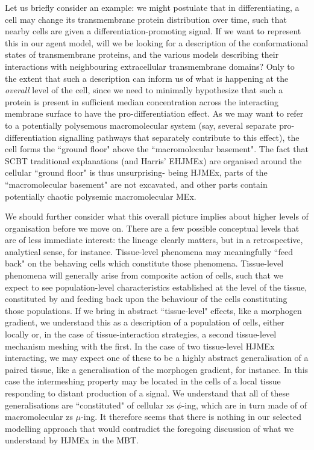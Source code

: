  Let us briefly consider an example: we might postulate that in differentiating, a cell may change its transmembrane protein distribution over time, such that nearby cells are given a differentiation-promoting signal. If we want to represent this in our agent model, will we be looking for a description of the conformational states of transmembrane proteins, and the various models describing their interactions with neighbouring extracellular transmembrane domains? Only to the extent that such a description can inform us of what is happening at the \textit{overall} level of the cell, since we need to minimally hypothesize that such a protein is present in sufficient median concentration across the interacting membrane surface to have the pro-differentiation effect. As we may want to refer to a potentially polysemous macromolecular system (say, several separate pro-differentiation signalling pathways that separately contribute to this effect), the cell forms the ``ground floor" above the ``macromolecular basement". The fact that SCBT traditional explanations (and Harris' EHJMEx) are organised around the cellular ``ground floor" is thus unsurprising- being HJMEx, parts of the ``macromolecular basement" are not excavated, and other parts contain potentially chaotic polysemic macromolecular MEx. 
 
 We should further consider what this overall picture implies about higher levels of organisation before we move on. There are a few possible conceptual levels that are of less immediate interest: the lineage clearly matters, but in a retrospective, analytical sense, for instance. Tissue-level phenomena may meaningfully ``feed back" on the behaving cells which constitute those phenomena. Tissue-level phenomena will generally arise from composite action of cells, such that we expect to see population-level characteristics established at the level of the tissue, constituted by and feeding back upon the behaviour of the cells constituting those populations. If we bring in abstract ``tissue-level" effects, like a morphogen gradient, we understand this as a description of a population of cells, either locally or, in the case of tissue-interaction strategies, a second tissue-level mechanism meshing with the first. In the case of two tissue-level HJMEx interacting, we may expect one of these to be a highly abstract generalisation of a paired tissue, like a generalisation of the morphogen gradient, for instance. In this case the intermeshing property may be located in the cells of a local tissue responding to distant production of a signal. We understand that all of these generalisations are ``constituted" of cellular xs $\phi$-ing, which are in turn made of of macromolecular zs $\mu$-ing. It therefore seems that there is nothing in our selected modelling approach that would contradict the foregoing discussion of what we understand by HJMEx in the MBT.
 
